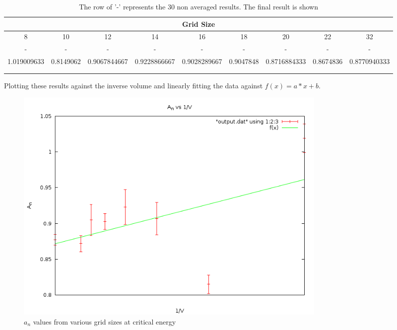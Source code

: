 \documentclass[10pt,a4paper]{article}
\begin{document}
\begin{table}[H]
\centering
\begin{adjustbox}{width=1\textwidth}
\begin{tabular}{ccccccccc}
\hline
\multicolumn{9}{|c|}{Grid Size} \\ \hline
\multicolumn{1}{|c|}{8} & \multicolumn{1}{c|}{10} & \multicolumn{1}{c|}{12} & \multicolumn{1}{c|}{14} & \multicolumn{1}{c|}{16} & \multicolumn{1}{c|}{18} & \multicolumn{1}{c|}{20} & \multicolumn{1}{c|}{22} & \multicolumn{1}{c|}{32} \\ \hline
\multicolumn{1}{|c|}{-} & \multicolumn{1}{c|}{-} & \multicolumn{1}{c|}{-} & \multicolumn{1}{c|}{-} & \multicolumn{1}{c|}{-} & \multicolumn{1}{c|}{-} & \multicolumn{1}{c|}{-} & \multicolumn{1}{c|}{-} & \multicolumn{1}{c|}{-} \\ \hline
\multicolumn{1}{|c|}{1.019009633} & \multicolumn{1}{c|}{0.8149062} & \multicolumn{1}{c|}{0.9067844667} & \multicolumn{1}{c|}{0.9228866667} & \multicolumn{1}{c|}{0.9028289667} & \multicolumn{1}{c|}{0.9047848} & \multicolumn{1}{c|}{0.8716884333} & \multicolumn{1}{c|}{0.8674836} & \multicolumn{1}{c|}{0.8770940333} \\ \hline
\multicolumn{1}{l}{} & \multicolumn{1}{l}{} & \multicolumn{1}{l}{} & \multicolumn{1}{l}{} & \multicolumn{1}{l}{} & \multicolumn{1}{l}{} & \multicolumn{1}{l}{} & \multicolumn{1}{l}{} & \multicolumn{1}{l}{} \\
\multicolumn{1}{l}{} & \multicolumn{1}{l}{} & \multicolumn{1}{l}{} & \multicolumn{1}{l}{} & \multicolumn{1}{l}{} & \multicolumn{1}{l}{} & \multicolumn{1}{l}{} & \multicolumn{1}{l}{} & \multicolumn{1}{l}{}
\end{tabular}
\end{adjustbox}
\caption{The row of '-' represents the 30 non averaged results. The final result is shown}
\end{table}

Plotting these results against the inverse volume and linearly fitting the data against $f(x) = a * x + b$.

\begin{figure}[H]
\centering
\includegraphics[width=0.75\textwidth]{q2variousgrid.png}
\caption{$a_n$ values from various grid sizes at critical energy}
\end{figure}
\end{document}
